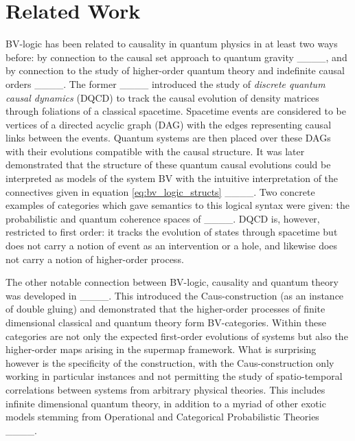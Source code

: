 \section{Related Work}
BV-logic has been related to causality in quantum physics in at least two ways before: by connection to the causal set approach to quantum gravity ____, and by connection to the study of higher-order quantum theory and indefinite causal orders ____.
The former ____ introduced the study of \textit{discrete quantum causal dynamics} (DQCD) to track the causal evolution of density matrices through foliations of a classical spacetime.
Spacetime events are considered to be vertices of a directed acyclic graph (DAG) with the edges representing causal links between the events.
Quantum systems are then placed over these DAGs with their evolutions compatible with the causal structure.
It was later demonstrated that the structure of these quantum causal evolutions could be interpreted as models of the system BV with the intuitive interpretation of the connectives given in equation \eqref{eq:bv_logic_structs} ____.
Two concrete examples of categories which gave semantics to this logical syntax were given: the probabilistic and quantum coherence spaces of ____.
DQCD is, however, restricted to first order: it tracks the evolution of states through spacetime but does not carry a notion of event as an intervention or a hole, and likewise does not carry a notion of higher-order process. 


The other notable connection between BV-logic, causality and quantum theory was developed in ____.
This introduced the Caus-construction (as an instance of double gluing) and demonstrated that the higher-order processes of finite dimensional classical and quantum theory form BV-categories.
Within these categories are not only the expected first-order evolutions of systems but also the higher-order maps arising in the supermap framework.
What is surprising however is the specificity of the construction, with the Caus-construction only working in particular instances and not permitting the study of spatio-temporal correlations between systems from arbitrary physical theories.
This includes infinite dimensional quantum theory, in addition to a myriad of other exotic models stemming from Operational and Categorical Probabilistic Theories ____.

